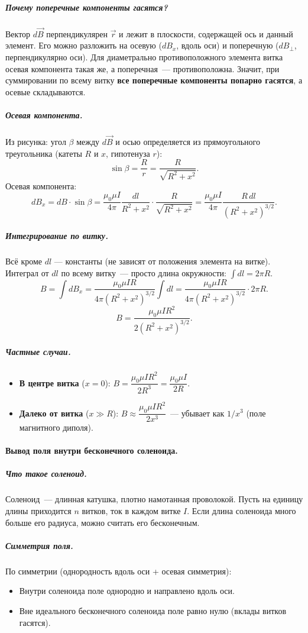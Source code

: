 \documentclass[12pt]{article}
\begin{document}
\subparagraph{Почему поперечные компоненты гасятся?}
Вектор $d\vec{B}$ перпендикулярен $\vec{r}$ и лежит в плоскости, содержащей ось
и данный элемент. Его можно разложить на осевую ($dB_x$, вдоль оси) и
поперечную ($dB_\perp$, перпендикулярно оси). Для диаметрально противоположного
элемента витка осевая компонента такая же, а поперечная~--- противоположна.
Значит, при суммировании по всему витку \textbf{все поперечные компоненты попарно
гасятся}, а осевые складываются.

\subparagraph{Осевая компонента.}
Из рисунка: угол $\beta$ между $d\vec{B}$ и осью определяется из
прямоугольного треугольника (катеты $R$ и $x$, гипотенуза $r$):
\[
    \sin\beta = \frac{R}{r} = \frac{R}{\sqrt{R^2 + x^2}}.
\]
Осевая компонента:
\[
    dB_x = dB\cdot\sin\beta
    = \frac{\mu_0\mu I}{4\pi}\frac{dl}{R^2+x^2}\cdot\frac{R}{\sqrt{R^2+x^2}}
    = \frac{\mu_0\mu I}{4\pi}\frac{R\,dl}{(R^2+x^2)^{3/2}}.
\]

\subparagraph{Интегрирование по витку.}
Всё кроме $dl$ --- константы (не зависят от положения элемента на витке).
Интеграл от $dl$ по всему витку~--- просто длина окружности: $\int dl = 2\pi R$.
\[
    B = \int dB_x = \frac{\mu_0\mu I R}{4\pi(R^2+x^2)^{3/2}}\int dl
    = \frac{\mu_0\mu I R}{4\pi(R^2+x^2)^{3/2}}\cdot 2\pi R.
\]
\[
    \boxed{B = \frac{\mu_0\mu I R^2}{2(R^2+x^2)^{3/2}}.}
\]

\subparagraph{Частные случаи.}
\begin{itemize}
    \item \textbf{В центре витка} ($x = 0$):
          $B = \dfrac{\mu_0\mu I R^2}{2R^3} = \dfrac{\mu_0\mu I}{2R}$.
    \item \textbf{Далеко от витка} ($x \gg R$):
          $B \approx \dfrac{\mu_0\mu I R^2}{2x^3}$~--- убывает как $1/x^3$
          (поле магнитного диполя).
\end{itemize}


\paragraph{Вывод поля внутри бесконечного соленоида.}

\subparagraph{Что такое соленоид.}
Соленоид~--- длинная катушка, плотно намотанная проволокой. Пусть на единицу
длины приходится $n$ витков, ток в каждом витке $I$. Если длина соленоида
много больше его радиуса, можно считать его бесконечным.

\subparagraph{Симметрия поля.}
По симметрии (однородность вдоль оси + осевая симметрия):
\begin{itemize}
    \item Внутри соленоида поле однородно и направлено вдоль оси.
    \item Вне идеального бесконечного соленоида поле равно нулю (вклады витков
          гасятся).
\end{itemize}
\end{document}
